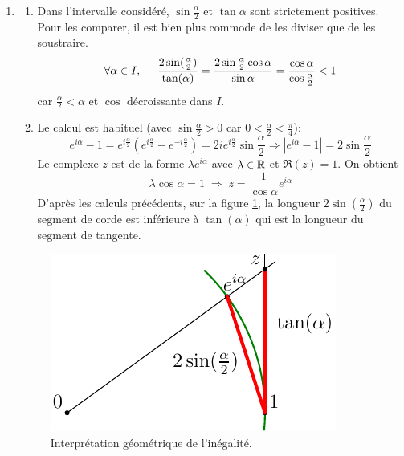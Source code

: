 \begin{enumerate}
  \item 
\begin{enumerate}
  \item Dans l'intervalle considéré, $\sin \frac{\alpha}{2}$ et $\tan \alpha$ sont strictement positives. Pour les comparer, il est bien plus commode de les diviser que de les soustraire.
\begin{displaymath}
\forall \alpha \in I,\hspace{0.5cm} \frac{2\sin(\frac{\alpha}{2})}{\tan(\alpha)} = \frac{2\sin \frac{\alpha}{2}\cos \alpha}{\sin \alpha}
= \frac{\cos \alpha}{\cos \frac{\alpha}{2}} < 1
\end{displaymath}
car $\frac{\alpha}{2} < \alpha$ et $\cos$ décroissante dans $I$.

  \item Le calcul est habituel (avec $\sin\frac{\alpha}{2}>0$ car $0<\frac{\alpha}{2}<\frac{\pi}{4}$):
\begin{displaymath}
  e^{i\alpha} -1 = e^{i\frac{\alpha}{2}}(e^{i\frac{\alpha}{2}}-e^{-i\frac{\alpha}{2}})=2ie^{i\frac{\alpha}{2}}\sin\frac{\alpha}{2}
  \Rightarrow \left|e^{i\alpha} -1\right| = 2 \sin\frac{\alpha}{2} 
\end{displaymath}
Le complexe $z$ est de la forme $\lambda e^{i\alpha}$ avec $\lambda\in \mathbb{R}$ et $\Re(z)=1$. On obtient
\begin{displaymath}
  \lambda \cos \alpha = 1 \;\Rightarrow\; z = \frac{1}{\cos \alpha}e^{i\alpha}
\end{displaymath}
D'après les calculs précédents, sur la figure \ref{fig:Cgregory_1}, la longueur $2\sin(\frac{\alpha}{2})$ du segment de corde est inférieure à $\tan(\alpha)$ qui est la longueur du segment de tangente.

\end{enumerate}
\begin{figure}[h]
  \centering
  \includegraphics{./Cgregory_1.pdf}
  \caption{Interprétation géométrique de l'inégalité.}
  \label{fig:Cgregory_1}
\end{figure}


\end{enumerate}
